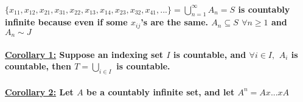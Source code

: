 \documentclass[10pt,a4paper]{article}
\begin{document}
 
\paragraph{$\lbrace x_{11},x_{12},x_{21},x_{31},x_{22},x_{13},x_{14},x_{23},
x_{32},x_{41},...\rbrace = \bigcup\limits_{n=1}^{\infty} A_{n} = S$ is countably infinite because even if some $x_{ij}$'s are the same.
\newline
$A_{n} \subseteq S$ $\forall n \geq 1 $ and $A_{n} \sim J$  }

\paragraph{\underline{Corollary 1:} Suppose an indexing set $I$ is countable, and $\forall i \in I,$
\newline 
 $A_{i}$ is countable, then $T =  \bigcup\limits_{i \in I}$ is countable.}
 
 \paragraph{\underline{Corollary 2:} Let $A$ be a countably infinite set, and let $A^{n} = A x ... x A$
\newline 
}
\end{document}
